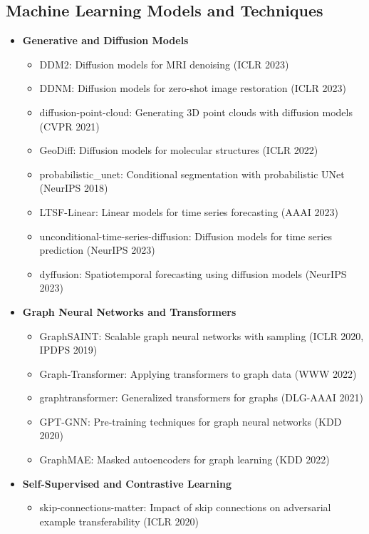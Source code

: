 \subsection*{Machine Learning Models and Techniques}
\begin{itemize}
    \item \textbf{Generative and Diffusion Models}
    \begin{itemize}
        \item DDM2: Diffusion models for MRI denoising (ICLR 2023)
        \item DDNM: Diffusion models for zero-shot image restoration (ICLR 2023)
        \item diffusion-point-cloud: Generating 3D point clouds with diffusion models (CVPR 2021)
        \item GeoDiff: Diffusion models for molecular structures (ICLR 2022)
        \item probabilistic\_unet: Conditional segmentation with probabilistic UNet (NeurIPS 2018)
        \item LTSF-Linear: Linear models for time series forecasting (AAAI 2023)
        \item unconditional-time-series-diffusion: Diffusion models for time series prediction (NeurIPS 2023)
        \item dyffusion: Spatiotemporal forecasting using diffusion models (NeurIPS 2023)
    \end{itemize}
    \item \textbf{Graph Neural Networks and Transformers}
    \begin{itemize}
        \item GraphSAINT: Scalable graph neural networks with sampling (ICLR 2020, IPDPS 2019)
        \item Graph-Transformer: Applying transformers to graph data (WWW 2022)
        \item graphtransformer: Generalized transformers for graphs (DLG-AAAI 2021)
        \item GPT-GNN: Pre-training techniques for graph neural networks (KDD 2020)
        \item GraphMAE: Masked autoencoders for graph learning (KDD 2022)
    \end{itemize}
    \item \textbf{Self-Supervised and Contrastive Learning}
    \begin{itemize}
        \item skip-connections-matter: Impact of skip connections on adversarial example transferability (ICLR 2020)

\end{itemize}
\end{itemize}
